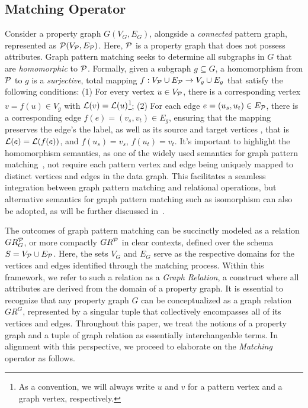 
\subsection{Matching Operator}
\label{sec:matching-operator}
Consider a property graph \(G(V_G, E_G)\), alongside a \emph{connected} pattern graph, represented as \(\mathcal{P}(V_{\mathcal{P}}, E_{\mathcal{P}})\). Here, \(\mathcal{P}\) is a property graph that does not possess attributes.
Graph pattern matching seeks to determine all subgraphs in \(G\) that are \emph{homomorphic} to \(\mathcal{P}\).
Formally, given a subgraph $g \subseteq G$, a homomorphism from \(\mathcal{P}\) to \(g\) is a \emph{surjective}, total mapping \(f: V_{\mathcal{P}} \cup E_{\mathcal{P}} \to V_{g} \cup E_{g}\) that satisfy the following conditions: (1) For every vertex \(u \in V_{\mathcal{P}}\), there is a corresponding vertex \(v = f(u) \in V_{g}\) with \(\mathcal{L}(v) = \mathcal{L}(u)\)\footnote{As a convention, we will always write $u$ and $v$ for a pattern vertex and a graph vertex, respectively.}; (2) For each edge \(e = (u_s, u_t) \in E_{\mathcal{P}}\), there is a corresponding edge \(f(e) = (v_s, v_t) \in E_{g}\), ensuring that the mapping preserves the edge's the label, as well as its source and target vertices , that is \(\mathcal{L}(e) = \mathcal{L}(f(e))\), and \(f(u_s) = v_s\), \(f(u_t) = v_t\). It's important to highlight the homomorphism semantics, as one of the widely used semantics for graph pattern matching~\cite{angles2017foundations},  not require each pattern vertex and edge being uniquely mapped to distinct vertices and edges in the data graph. This facilitates a seamless integration between graph pattern matching and relational operations, but alternative semantics for graph pattern matching such as isomorphism can also be adopted, as will be further discussed in~.

The outcomes of graph pattern matching can be succinctly modeled as a relation \(GR_G^{\mathcal{P}}\), or more compactly \(GR^{\mathcal{P}}\) in clear contexts, defined over the schema \(S = V_{\mathcal{P}} \cup E_{\mathcal{P}}\). Here, the sets \(V_G\) and \(E_G\) serve as the respective domains for the vertices and edges identified through the matching process. Within this framework, we refer to such a relation as a \emph{Graph Relation}, a construct where all attributes are derived from the domain of a property graph.
It is essential to recognize that any property graph \(G\) can be conceptualized as a graph relation \(GR^G\), represented by a singular tuple that collectively encompasses all of its vertices and edges. Throughout this paper, we treat the notions of a property graph and a tuple of graph relation as essentially interchangeable terms. In alignment with this perspective, we proceed to elaborate on the \emph{Matching} operator as follows.

